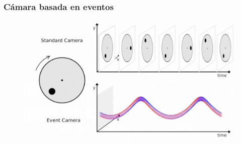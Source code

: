 \begin{frame}
    \frametitle{Cámara basada en eventos}
    
    
    
    \begin{figure}[!h]
        \centering
        \includegraphics[width=0.8\columnwidth]{images/event_camera.png}
    \end{figure}

\end{frame}